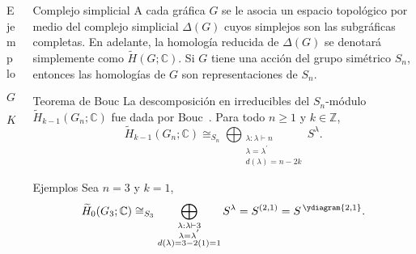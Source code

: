 \documentclass[final,xcolor=svgnames]{beamer}
\begin{document}
\begin{frame}{}
\begin{columns}
\begin{column}{0.5\textwidth}
\begin{block}{Ejemplo}
\begin{minipage}{0.3\linewidth}
            $G_{4}$
          \end{minipage}
        \begin{minipage}{0.3\linewidth}    
          \centering

            $K(G_{4})$
          \end{minipage}
      \end{block}
    \end{column}

    \begin{column}{0.5\textwidth}
      \begin{block}{Complejo simplicial}
        A cada gráfica $G$ se le asocia un espacio topológico por
        medio del complejo simplicial $\Delta(G)$ cuyos simplejos son
        las subgráficas completas. En adelante, la homología reducida
        de $\Delta(G)$ se denotará simplemente como $\widetilde
        H(G;\mathbb{C})$. Si $G$ tiene una acción del grupo simétrico
        $S_{n}$, entonces las homologías de $G$ son representaciones
        de $S_{n}$.
      \end{block}

      \begin{block}{Teorema de Bouc}
        La descomposición en irreducibles del $S_{n}$-módulo
        $\widetilde H_{k-1}(G_{n};\mathbb{C})$ fue dada por Bouc~\cite{MR756517}. Para
        todo $n\geq1$ y $k\in \mathbb{Z}$,
          \begin{equation*}
            \widetilde H_{k-1}(G_{n};\mathbb{C})\cong_{S_{n}}\bigoplus_{\substack{\lambda:\lambda\vdash n\\
              \lambda=\lambda^{'}\\d(\lambda)=n-2k}} S^{\lambda}.
          \end{equation*}
       \end{block}
       
        \begin{block}{Ejemplos} 
          Sea $n=3$ y $k=1$,
          \begin{equation*}
            \widetilde H_{0}(G_{3};\mathbb{C})\cong_{S_{3}}\bigoplus_{\substack{\lambda:\lambda\vdash 3\\
                \lambda=\lambda^{'}\\d(\lambda)=3-2(1)=1}} S^{\lambda}=S^{(2,1)}=S^{\,\ydiagram{2,1}}.
          \end{equation*}
          

\end{block}
\end{column}
\end{columns}
\end{frame}
\end{document}
